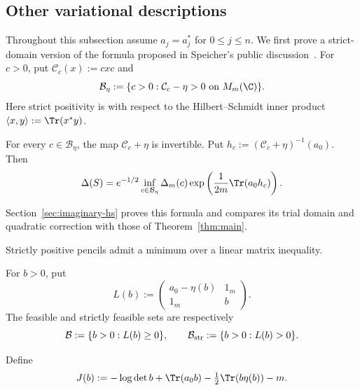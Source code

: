 \subsection{Other variational descriptions}
Throughout this subsection assume $a_j=a_j^*$ for $0\le j\le n$.
We first prove a strict-domain version of the formula proposed in Speicher's public discussion~\cite{Spe26}.
For $c>0$, put $\mathcal C_c(x):=cxc$ and
\begin{equation}\label{eq:hs-domain}
 \mathcal B_\eta:=
 \{c>0:\mathcal C_c-\eta>0\text{ on }M_m(\C)\}.
\end{equation}
Here strict positivity is with respect to the Hilbert--Schmidt inner product $\langle x,y\rangle:=\Tr(x^*y)$.

\begin{proposition}\label{prop:hs-formula}
For every $c\in\mathcal B_\eta$, the map $\mathcal C_c+\eta$ is invertible.
Put $h_c:=(\mathcal C_c+\eta)^{-1}(a_0)$.
Then
\begin{equation}\label{eq:hs-determinant}
 \Delta(S)=e^{-1/2}\inf_{c\in\mathcal B_\eta}
       \Delta_m(c)\exp\left(\frac1{2m}\Tr(a_0h_c)\right).
\end{equation}
\end{proposition}
Section~\ref{sec:imaginary-hs} proves this formula and compares its trial domain and quadratic correction with those of Theorem~\ref{thm:main}.

Strictly positive pencils admit a minimum over a linear matrix inequality.
\begin{definition}\label{def:positive-feasibility}
For $b>0$, put
\begin{equation}\label{eq:positive-lmi}
 L(b):=\begin{pmatrix}a_0-\eta(b)&1_m\\1_m&b\end{pmatrix}.
\end{equation}
The feasible and strictly feasible sets are respectively
\begin{equation}\label{eq:feasible-set}
 \mathcal B:=\{b>0:L(b)\ge0\},\qquad
 \mathcal B_{\rm str}:=\{b>0:L(b)>0\}.
\end{equation}
\end{definition}
Define
\begin{equation}\label{eq:positive-objective}
 J(b):=-\log\det b+\Tr(a_0b)-\tfrac12\Tr(b\eta(b))-m.
\end{equation}

